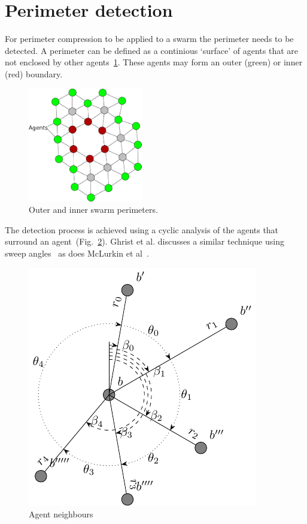 \documentclass[12pt,a4paper]{article}
\begin{document}
\section{Perimeter detection}\label{perimeterDetection}
For perimeter compression to be applied to a swarm the perimeter needs to be detected. A perimeter can be defined as a continious `surface' of agents that are not enclosed by other agents~\ref{fig:innerOuterPerimeters}. These agents may form an outer ({\color{green}green}) or inner ({\color{red}red}) boundary.

\begin{figure}[H]
	\begin{center}
	\includegraphics[width=5cm]{figures/PerimeterBots1}
	\end{center}
	\caption{{\color{green}Outer} and {\color{red}inner} swarm perimeters. \label{fig:innerOuterPerimeters}}
\end{figure}


The detection process is achieved using a cyclic analysis of the agents that surround an agent~(Fig.~\ref{fig:neighbours}). Ghrist et al. discusses a similar technique using sweep angles~\cite{ghrist2008surrounding} as does McLurkin et al~\cite{mclurkin2009}. 

\begin{figure}[H]
	\centering
	\includegraphics[width=0.4\linewidth]{figures/neighbours}
	\caption[Agent neighbours]{Agent neighbours}
	\label{fig:neighbours}
\end{figure}
\end{document}
